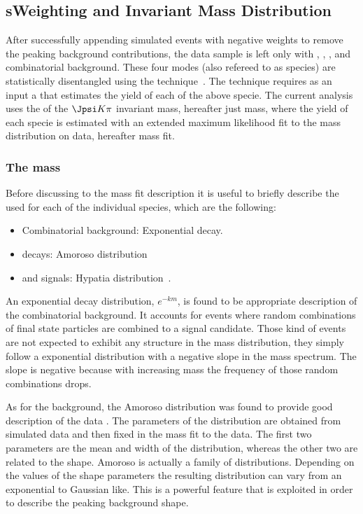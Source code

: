 \subsection{sWeighting and Invariant Mass Distribution}
\label{sWeighting_and_mass}

After successfully appending simulated events with negative weights to remove the peaking background contributions, the data sample is left only with
\BdJpsiKpi, \BsJpsiKpi, \LbJpsippi, and combinatorial background. These four modes (also refereed to as species) are statistically 
disentangled using the \sPlot technique~\cite{splot}. The technique requires as an input a \pdf that estimates the yield of each 
of the above specie. The current analysis uses the \pdf of the $\Jpsi K\pi$ invariant mass, hereafter just mass, where the yield of each specie
is estimated with an extended maximum likelihood fit to the mass distribution on data, hereafter mass fit. 

\subsubsection{The mass \pdf}
Before discussing to the mass fit description it is useful to briefly describe the \pdfs used for each of the individual species, which are the following:  

\begin{itemize}
\item Combinatorial background: Exponential decay.
\item \LbJpsippi decays: Amoroso distribution~\cite{Amoroso}
\item \Bd and \Bs signals: Hypatia distribution~\cite{Santos:2013gra}.
\end{itemize}

\noindent An exponential decay distribution, $e^{-km}$, is found to be appropriate description of the combinatorial background. It  accounts 
for events where random combinations of final state particles are combined to a signal candidate. Those kind of events are not expected to
exhibit any structure in the mass distribution, they simply follow a exponential distribution with a negative slope in the mass spectrum. The slope is
negative because with increasing mass the frequency of those random combinations drops.  

As for the \LbJpsippi background, the Amoroso distribution was found to provide good description of the data . 
The parameters of the distribution are obtained from simulated data and then fixed in the mass fit to the data. The first two parameters
are the mean and width of the distribution, whereas the other two are related to the shape. Amoroso is actually a family of distributions. 
Depending on the values of the shape parameters the resulting distribution can vary from an exponential to Gaussian like. This is a powerful
feature that is exploited in order to describe the \LbJpsippi peaking background shape.  

